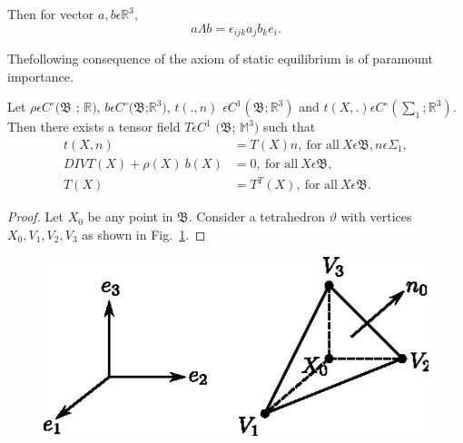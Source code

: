Then for vector $a,b \epsilon \mathbb{R}^3$,
\begin{equation*}
  a \Lambda b = \epsilon_{ijk} a_j b_k e_i.\tag{1.2-5}\label{eq1.2-5}
\end{equation*}

The\pageoriginale  following consequence of the axiom of static
equilibrium is of paramount importance. 

\begin{theorem}\label{chap1-thm1.2.1}%
Let $\rho \epsilon C^\circ(\mathfrak{B}$ ;
  $\mathbb{R})$, $b \epsilon C^\circ(\mathfrak{B}$;$\mathbb{R}^3)$,
  $t(.,n)$ $\epsilon C^1(\mathfrak{B}; \mathbb{R}^3)$ and
  $t(X,.)\epsilon C^\circ (\sum_1 ; \mathbb{R}^3)$. Then there
  exists a tensor field $T \epsilon C^1$ $(\mathfrak{B}$;
  $\mathbb{M}^3)$ such that 
\begin{align*}
  t(X,n) & = T(X) n, ~\text{for all}~ X\epsilon
  \mathfrak{B},n\epsilon \Sigma_1,\tag{1.2-6} \label{eq1.2-6}\\ 
  DIV T(X) + \rho(X)~ b(X) & = 0, ~\text{for all}~ X \epsilon
  \mathfrak{B},\tag{1.2-7}\label{eq1.2-7}\\ 
  T(X) &= T^T(X), ~\text{for all}~ X \epsilon
  \mathfrak{B}.\tag{1.2-8} \label{eq1.2-8}
\end{align*}
\end{theorem}

\begin{proof}
Let $X_0$ be any point in $\mathfrak{B}$. Consider a tetrahedron
$\vartheta$ with vertices $X_0,V_1,V_2,V_3$ as shown in
Fig.~\ref{fig1.2.2}.  
\end{proof}

\begin{figure}[H]
\centering
\includegraphics{vol71-figures/fig1.2-2.eps}
\caption{}\label{fig1.2.2}
\end{figure}

